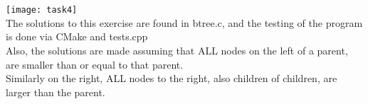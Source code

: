 \documentclass{article}
\begin{document}
\section{}
\texttt{[image: task4]}
\vspace{5pt}\\
The solutions to this exercise are found in btree.c, and the testing of the program is done via CMake and tests.cpp\\
Also, the solutions are made assuming that ALL nodes on the left of a parent, are smaller than or equal to that parent.\\
Similarly on the right, ALL nodes to the right, also children of children, are larger than the parent.
\end{document}
